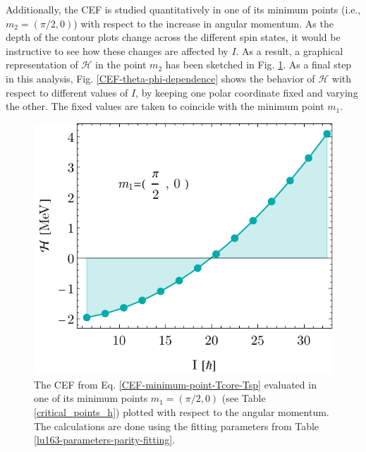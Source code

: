 Additionally, the CEF is studied quantitatively in one of its minimum points (i.e., $m_2=(\pi/2,0)$) with respect to the increase in angular momentum. As the depth of the contour plots change across the different spin states, it would be instructive to see how these changes are affected by $I$. As a result, a graphical representation of $\mathcal{H}$ in the point $m_2$ has been sketched in Fig. \ref{CEF-m2-I-dependence}. As a final step in this analysis, Fig. \ref{CEF-theta-phi-dependence} shows the behavior of $\mathcal{H}$ with respect to different values of $I$, by keeping one polar coordinate fixed and varying the other. The fixed values are taken to coincide with the minimum point $m_1$.
\begin{figure}
    \centering
    \includegraphics[scale=0.75]{Chapters/Figures/parity-partners-plots/H-minimal-m1.pdf}
    \caption{The CEF from Eq. \ref{CEF-minimum-point-Tcore-Tsp} evaluated in one of its minimum points $m_1=(\pi/2,0)$ (see Table \ref{critical_points_h}) plotted with respect to the angular momentum. The calculations are done using the fitting parameters from Table \ref{lu163-parameters-parity-fitting}.}
    \label{CEF-m2-I-dependence}
\end{figure}
